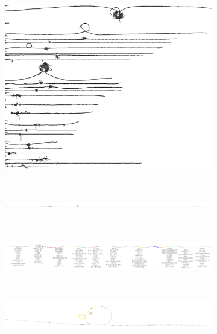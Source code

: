 \begin{figure}[!htb]
	\centering
	\begin{subfigure}{1.0\textwidth}
		\centering
		\caption{}
		\includegraphics[width=1.0\linewidth]{fig/2D/2D_all_chroms.png}
		\label{fig:sfig1}
	\end{subfigure}
	\\
	\begin{subfigure}{1.0\textwidth}
		\centering
		\caption{}
		\includegraphics[width=1.0\linewidth]{fig/2D/grch38.chr6.MHC_annotated.png}
		\label{fig:sfig2}
	\end{subfigure}
	\\
\begin{subfigure}{1.0\textwidth}
	\centering
	\caption{}
	\includegraphics[width=1.0\linewidth]{fig/2D/grch38.chr6.MHC_genes_annotated.png}
	\label{fig:sfig3}
\end{subfigure}
	\\
\begin{subfigure}{1.0\textwidth}
	\centering
	\caption{}
	\includegraphics[width=1.0\linewidth]{fig/2D/grch38.chr6.C4_gene_annotated.png}

\end{subfigure}
\end{figure}

